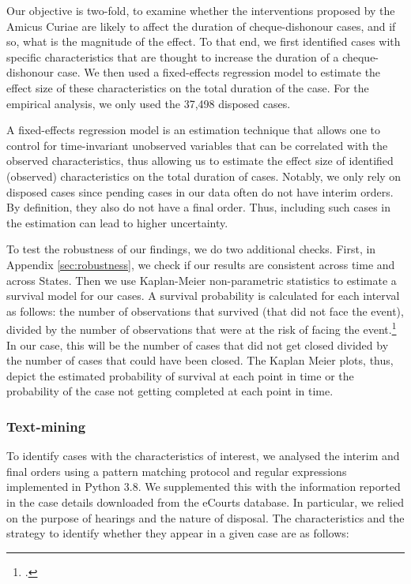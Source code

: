 Our objective is two-fold, to examine whether the interventions proposed by the Amicus Curiae are likely to affect the duration of cheque-dishonour cases, and if so, what is the magnitude of the effect. To that end, we first identified cases with specific characteristics that are thought to increase the duration of a cheque-dishonour case. We then used a fixed-effects regression model to estimate the effect size of these characteristics on the total duration of the case. For the empirical analysis, we only used the 37,498 disposed cases.

A fixed-effects regression model is an estimation technique that allows one to control for time-invariant unobserved variables that can be correlated with the observed characteristics, thus allowing us to estimate the effect size of identified (observed) characteristics on the total duration of cases. Notably, we only rely on disposed cases since pending cases in our data often do not have interim orders. By definition, they also do not have a final order. Thus, including such cases in the estimation can lead to higher uncertainty.

To test the robustness of our findings, we do two additional checks. First, in Appendix \ref{sec:robustness}, we check if our results are consistent across time and across States. Then we use Kaplan-Meier non-parametric statistics to estimate a survival model for our cases. A survival probability is calculated for each interval as follows: the number of observations that survived (that did not face the event), divided by the number of observations that were at the risk of facing the event.\footcite{rich2010practical} In our case, this will be the number of cases that did not get closed divided by the number of cases that could have been closed. The Kaplan Meier plots, thus, depict the estimated probability of survival at each point in time or the probability of the case not getting completed at each point in time.

\subsubsection{Text-mining} \label{sec:text-mining}

To identify cases with the characteristics of interest, we analysed the interim and final orders using a pattern matching protocol and regular expressions implemented in Python 3.8. We supplemented this with the information reported in the case details downloaded from the eCourts database. In particular, we relied on the purpose of hearings and the nature of disposal. The characteristics and the strategy to identify whether they appear in a given case are as follows:

